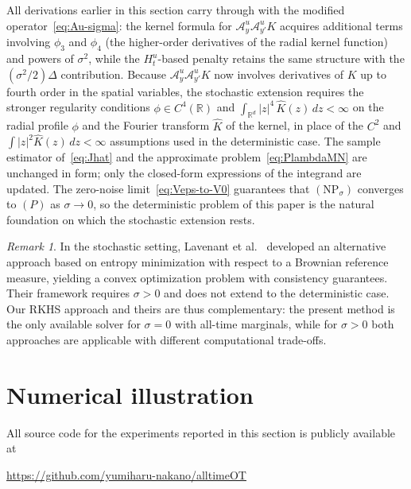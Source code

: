 \documentclass[11pt,leqno]{article}
\theoremstyle{plain}
\theoremstyle{remark}
\newtheorem*{rem}{Remark}
\theoremstyle{definition}
\numberwithin{equation}{section}
\numberwithin{figure}{section}
\numberwithin{table}{section}
\begin{document}
All derivations earlier in this section carry through with the modified
operator~\eqref{eq:Au-sigma}: the kernel formula for
$\mathcal{A}^u_y\mathcal{A}^u_{y'}K$ acquires additional terms involving
$\phi_3$ and $\phi_4$ (the higher-order derivatives of the radial kernel
function) and powers of $\sigma^2$, while the $H_t^u$-based penalty
retains the same structure with the $(\sigma^2/2)\Delta$
contribution.  Because $\mathcal{A}^u_y\mathcal{A}^u_{y'}K$ now involves
derivatives of $K$ up to fourth order in the spatial variables, the
stochastic extension requires the stronger regularity conditions
$\phi\in C^4(\mathbb{R})$ and $\int_{\mathbb{R}^d}|z|^4\,\widehat{K}(z)\,dz<\infty$
on the radial profile $\phi$ and the Fourier transform $\widehat{K}$ of the
kernel, in place of the $C^2$ and $\int|z|^2\widehat{K}(z)\,dz<\infty$
assumptions used in the deterministic case.  The sample estimator
of~\eqref{eq:Jhat} and the approximate problem~\eqref{eq:PlambdaMN}
are unchanged in form; only the closed-form expressions of the
integrand are updated.
The zero-noise limit~\eqref{eq:Veps-to-V0} guarantees that
$(\mathrm{NP}_\sigma)$ converges to $(P)$ as $\sigma\to 0$, so the
deterministic problem of this paper is the natural foundation on
which the stochastic extension rests.

\begin{rem}
In the stochastic setting, Lavenant et al.\ \cite{lav:2024}
developed an alternative approach based on entropy minimization with
respect to a Brownian reference measure, yielding a convex optimization
problem with consistency guarantees.  Their framework requires
$\sigma>0$ and does not extend to the deterministic case.  Our RKHS
approach and theirs are thus complementary: the present method is the
only available solver for $\sigma=0$ with all-time marginals, while for
$\sigma>0$ both approaches are applicable with different computational
trade-offs.
\end{rem}


\section{Numerical illustration}
\label{sec:numerical}

All source code for the experiments reported in this section is
publicly available at
\begin{center}
  \url{https://github.com/yumiharu-nakano/alltimeOT}
\end{center}
\end{document}
